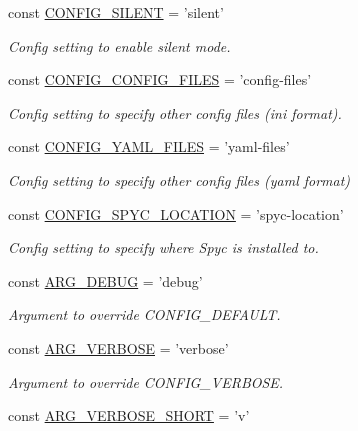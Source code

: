\begin{DoxyCompactItemize}
const \hyperlink{group__config_gae51e7d020c4c382825abd620db8f406b}{C\-O\-N\-F\-I\-G\-\_\-\-S\-I\-L\-E\-N\-T} = 'silent'
\begin{DoxyCompactList}\small\item\em Config setting to enable silent mode. \end{DoxyCompactList}\item 
const \hyperlink{group__config_gae9bcc12ef43805dccf313d96ba6949ac}{C\-O\-N\-F\-I\-G\-\_\-\-C\-O\-N\-F\-I\-G\-\_\-\-F\-I\-L\-E\-S} = 'config-\/files'
\begin{DoxyCompactList}\small\item\em Config setting to specify other config files (ini format). \end{DoxyCompactList}\item 
const \hyperlink{group__config_gac84613fd7b98146ba56ca2d0ebad83c5}{C\-O\-N\-F\-I\-G\-\_\-\-Y\-A\-M\-L\-\_\-\-F\-I\-L\-E\-S} = 'yaml-\/files'
\begin{DoxyCompactList}\small\item\em Config setting to specify other config files (yaml format) \end{DoxyCompactList}\item 
const \hyperlink{group__config_ga1c9780167f4edef2e4a8688045caeedb}{C\-O\-N\-F\-I\-G\-\_\-\-S\-P\-Y\-C\-\_\-\-L\-O\-C\-A\-T\-I\-O\-N} = 'spyc-\/location'
\begin{DoxyCompactList}\small\item\em Config setting to specify where Spyc is installed to. \end{DoxyCompactList}\item 
const \hyperlink{group__args_ga4c16b86b9d4656b8c7c6d27510566d77}{A\-R\-G\-\_\-\-D\-E\-B\-U\-G} = 'debug'
\begin{DoxyCompactList}\small\item\em Argument to override C\-O\-N\-F\-I\-G\-\_\-\-D\-E\-F\-A\-U\-L\-T. \end{DoxyCompactList}\item 
const \hyperlink{group__args_gac79062d79c803c74aee0337d9637f574}{A\-R\-G\-\_\-\-V\-E\-R\-B\-O\-S\-E} = 'verbose'
\begin{DoxyCompactList}\small\item\em Argument to override C\-O\-N\-F\-I\-G\-\_\-\-V\-E\-R\-B\-O\-S\-E. \end{DoxyCompactList}\item 
const \hyperlink{group__args_gab83df86552c8e9e5c2382a8948111235}{A\-R\-G\-\_\-\-V\-E\-R\-B\-O\-S\-E\-\_\-\-S\-H\-O\-R\-T} = 'v'

\end{DoxyCompactItemize}
